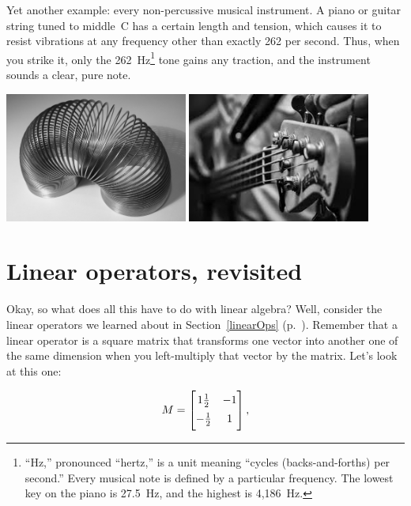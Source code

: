 
Yet another example: every non-percussive musical instrument. A piano or guitar
string tuned to middle~C has a certain length and tension, which causes it to
resist vibrations at any frequency other than exactly 262 per second. Thus,
when you strike it, only the 262~Hz\footnote{``Hz,'' pronounced ``hertz,'' is a
unit meaning ``cycles (backs-and-forths) per second.'' Every musical note is
defined by a particular frequency. The lowest key on the piano is 27.5~Hz, and
the highest is 4,186~Hz.} tone gains any traction, and the instrument sounds a
clear, pure note.

\begin{center}
\label{slinky}
\includegraphics[width=0.45\textwidth]{slinky.jpg}
\quad
\includegraphics[width=0.45\textwidth]{guitar.jpg}
\end{center}

\section{Linear operators, revisited}


Okay, so what does all this have to do with linear algebra? Well, consider the
linear operators we learned about in Section~\ref{linearOps}
(p.~\pageref{linearOps}). Remember that a linear operator is a square matrix
that transforms one vector into another one of the same dimension when you
left-multiply that vector by the matrix. Let's look at this one:


\begin{align*}
\renewcommand*{\arraystretch}{1.4}
M =
\begin{bmatrix}
1\frac{1}{2} & -1 \\
\smallskip
-\frac{1}{2} & 1 \\
\end{bmatrix},
\end{align*}

